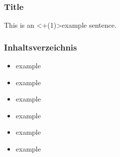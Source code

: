 \documentclass[ngerman,14pt]{beamer}
\begin{document}
\begin{frame}
  \frametitle{Title}
  This is an \alert<+(1)>{example} sentence.
\end{frame}


\begin{frame}
\frametitle{Inhaltsverzeichnis}

\begin{itemize}
\item \alert<1>{example}
\item \alert<2>{example}
\item \alert<3>{example}
\item \alert<4>{example}
\item \alert<5>{example}
\item \alert<6>{example}
\end{itemize}
\end{frame}
\end{document}
